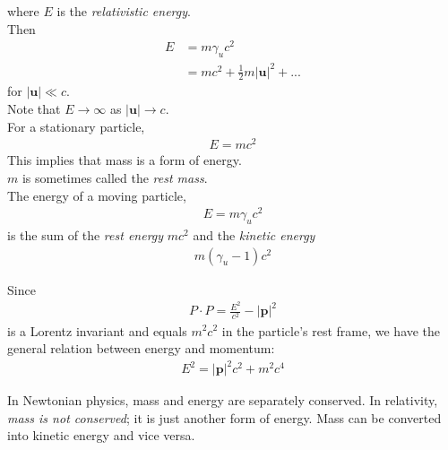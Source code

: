 \documentclass[a4paper]{article}
\begin{document}
where $E$ is the \emph{relativistic energy}.\\
Then
\begin{equation*}
\begin{aligned}
E&=m\gamma_u c^2\\
&=mc^2 + \frac{1}{2}m|\mathbf{u}|^2 + ...
\end{aligned}
\end{equation*}
for $|\mathbf{u}| \ll c$.\\
Note that $E\to \infty$ as $|\mathbf{u}| \to c$.\\
For a stationary particle,
\begin{equation*}
\begin{aligned}
E=mc^2
\end{aligned}
\end{equation*}
This implies that mass is a form of energy.\\
$m$ is sometimes called the \emph{rest mass}.\\
The energy of a moving particle,
\begin{equation*}
\begin{aligned}
E=m\gamma_u c^2
\end{aligned}
\end{equation*}
is the sum of the \emph{rest energy} $mc^2$ and the \emph{kinetic energy}
\begin{equation*}
\begin{aligned}
m\left(\gamma_u-1\right)c^2
\end{aligned}
\end{equation*}

Since
\begin{equation*}
\begin{aligned}
P\cdot P = \frac{E^2}{c^2} - |\mathbf{p}|^2
\end{aligned}
\end{equation*}
is a Lorentz invariant and equals $m^2c^2$ in the particle's rest frame, we have the general relation between energy and momentum:
\begin{equation*}
\begin{aligned}
E^2 = |\mathbf{p}|^2 c^2 + m^2 c^4
\end{aligned}
\end{equation*}

In Newtonian physics, mass and energy are separately conserved. In relativity, \emph{mass is not conserved}; it is just another form of energy. Mass can be converted into kinetic energy and vice versa.
\end{document}
